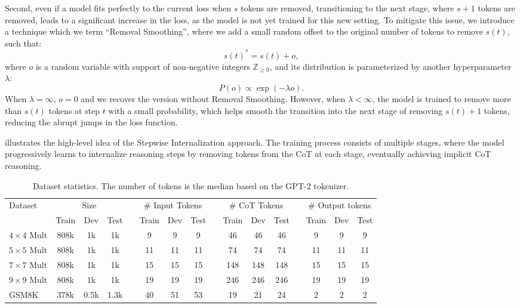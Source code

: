 \documentclass{article}
\begin{document}
Second, even if a model fits perfectly to the current loss when $s$ tokens are removed, transitioning to the next stage, where $s+1$ tokens are removed, leads to a significant increase in the loss, as the model is not yet trained for this new setting. To mitigate this issue, we introduce a technique which we term ``Removal Smoothing'', where we add a small random offset to the original number of tokens to remove $s(t)$, such that:
\begin{equation*}
s(t)^* = s(t) + o,
\end{equation*}
where $o$ is a random variable with support of non-negative integers $\mathbb{Z}_{\ge0}$, and its distribution is parameterized by another hyperparameter $\lambda$:
\begin{equation*}
P(o) \propto \exp(-\lambda o).
\end{equation*}
When $\lambda=\infty$, $o=0$ and we recover the version without Removal Smoothing. However, when $\lambda<\infty$, the model is trained to remove more than $s(t)$ tokens at step $t$ with a small probability, which helps smooth the transition into the next stage of removing $s(t)+1$ tokens, reducing the abrupt jumps in the loss function.


 illustrates the high-level idea of the Stepwise Internalization approach. The training process consists of multiple stages, where the model progressively learns to internalize reasoning steps by removing tokens from the CoT at each stage, eventually achieving implicit CoT reasoning.

\begin{table}[!t]
    \centering
    \caption{\label{tab:dataset}Dataset statistics. The number of tokens is the median based on the GPT-2 tokenizer.}
    \begin{tabular}{lc@{ }c@{ }ccc@{ }c@{ }ccc@{ }c@{ }ccc@{ }c@{ }c}
    \toprule
    \multirow{2}{*}{Dataset} & \multicolumn{3}{c}{Size} & &\multicolumn{3}{c}{\# Input Tokens}               & &\multicolumn{3}{c}{\# CoT Tokens} & &\multicolumn{3}{c}{\# Output tokens}  \\    
    \cmidrule{2-4}\cmidrule{6-8}\cmidrule{10-12}
   \cmidrule{14-16}
   &  Train  & Dev & Test  &  &  Train & Dev & Test   && Train & Dev & Test && Train & Dev & Test   \\
    \midrule
        $4\times4$ Mult & 808k & 1k & 1k && 9 & 9 & 9 && 46 & 46 & 46 && 9 & 9 & 9 \\
        $5\times5$ Mult & 808k & 1k & 1k && 11 & 11 & 11 && 74 & 74 & 74 && 11 & 11 & 11 \\
        $7\times7$ Mult & 808k & 1k & 1k && 15 & 15 & 15 && 148 & 148 & 148 && 15 & 15 & 15 \\
        $9\times9$ Mult & 808k & 1k & 1k && 19 & 19 & 19 && 246 & 246 & 246 && 19 & 19 & 19 \\
        GSM8K & 378k & 0.5k & 1.3k && 40 & 51 & 53 && 19 & 21 & 24 && 2 & 2 & 2\\
        \bottomrule
    \end{tabular}
\end{table}
\end{document}
